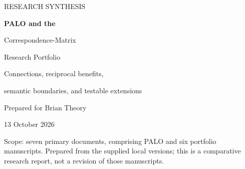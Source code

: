 \documentclass[11pt,a4paper]{article}
\theoremstyle{remark}
\begin{document}
\hypersetup{pageanchor=false}
\begin{titlepage}
\vspace*{13mm}
{\color{teal}\large RESEARCH SYNTHESIS\par}
\vspace{8mm}
{\color{navy}\Huge\bfseries PALO and the\par Correspondence-Matrix\par Research Portfolio\par}
\vspace{9mm}
{\Large Connections, reciprocal benefits,\par semantic boundaries, and testable extensions\par}
\vspace{14mm}
{\large Prepared for Brian Theory\par}
{\large 13 October 2026\par}
\vspace{12mm}
\begin{abstract}
Probabilistic Approximate Logic (PALO) combines symbolic domain theories with continuous, learnable models. The correspondence-matrix portfolio develops exact Boolean representations, a bounded compiler, certified extraction of Boolean operators from continuous scores, regularity restrictions on sign realizations, and separate finite-ring support and process theories. These projects share several interfaces, but they do not share one semantics.

The closest practical connection is guarded extraction and validation of discrete behavior from a PALO-style learned model. The closest algebraic connection is that real-valued contraction of a binary correspondence matrix reproduces PALO's primitive soft connective formulas under a product-distribution interpretation. This report derives that connection, makes its dependence assumptions explicit, and shows why exact Boolean rewrites need not preserve a soft learning objective. Finite-jet rigidity supplies a conditional expressivity boundary for uniform sign specifications. The chain-ring papers provide more distant lessons about support, composition, and global consistency.

The report develops benefits in both directions and a staged research agenda. It separates statements in the supplied manuscripts, elementary consequences established here, and proposed work. It reports no new learning benchmark, integrated implementation, historical-priority determination, or independent certification of the source manuscripts.
\end{abstract}
\vfill
{\small Scope: seven primary documents, comprising PALO and six portfolio manuscripts. Prepared from the supplied local versions; this is a comparative research report, not a revision of those manuscripts.}
\end{titlepage}
\hypersetup{pageanchor=true}
\tableofcontents
\clearpage
{}
\end{document}
